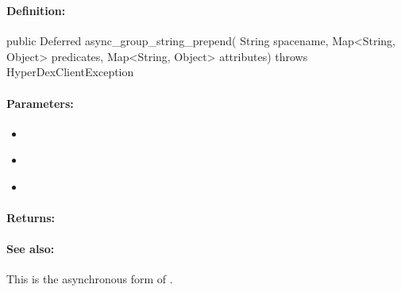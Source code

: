 \pagebreak
\subsubsection{}
\label{api:java:async_group_string_prepend}


\paragraph{Definition:}
\begin{javacode}
public Deferred async_group_string_prepend(
        String spacename,
        Map<String, Object> predicates,
        Map<String, Object> attributes) throws HyperDexClientException
\end{javacode}

\paragraph{Parameters:}
\begin{itemize}[noitemsep]
\item {}\\

\item {}\\

\item {}\\

\end{itemize}

\paragraph{Returns:}


\paragraph{See also:}  This is the asynchronous form of .

\pagebreak
\subsubsection{}
\label{api:java:string_append}



